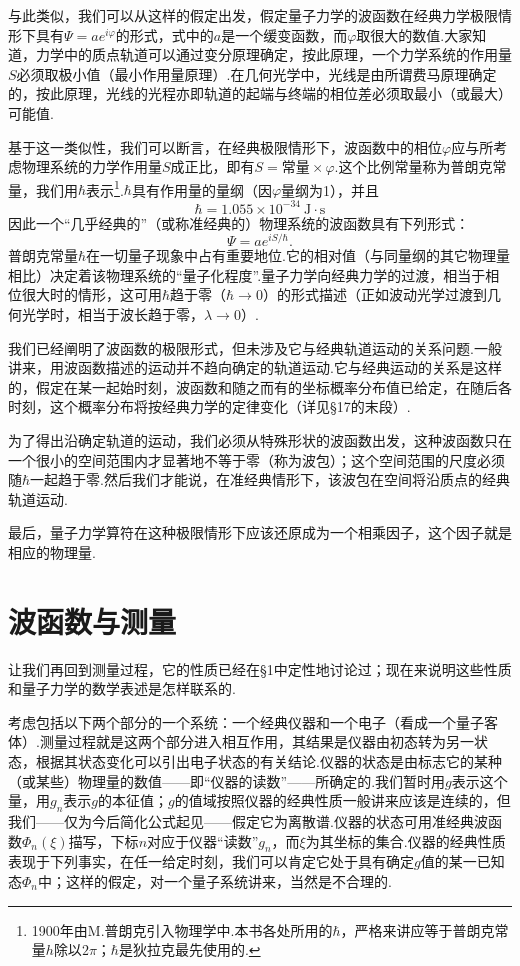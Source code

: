 与此类似，我们可以从这样的假定出发，假定量子力学的波函数在经典力学极限情形下具有$\varPsi=ae^{i\varphi}$的形式，式中的$a$是一个缓变函数，而$\varphi$取很大的数值.大家知道，力学中的质点轨道可以通过变分原理确定，按此原理，一个力学系统的作用量$S$必须取极小值（最小作用量原理）.在几何光学中，光线是由所谓费马原理确定的，按此原理，光线的光程亦即轨道的起端与终端的相位差必须取最小（或最大）可能值.

基于这一类似性，我们可以断言，在经典极限情形下，波函数中的相位$\varphi$应与所考虑物理系统的力学作用量$S$成正比，即有$S=\text{常量}\times\varphi$.这个比例常量称为普朗克常量，我们用$\hbar$表示\footnote{1900年由M.普朗克引入物理学中.本书各处所用的$\hbar$，严格来讲应等于普朗克常量$h$除以$2\pi$；$\hbar$是狄拉克最先使用的.}.$\hbar$具有作用量的量纲（因$\varphi$量纲为1），并且
\begin{equation*}
  \hbar=1.055\times10^{-34}\ \mathrm{J}\cdot\mathrm{s}
\end{equation*}
因此一个“几乎经典的”（或称准经典的）物理系统的波函数具有下列形式：
\begin{equation}
  \varPsi=ae^{iS/\hbar}.
\end{equation}
普朗克常量$\hbar$在一切量子现象中占有重要地位.它的相对值（与同量纲的其它物理量相比）决定着该物理系统的“量子化程度”.量子力学向经典力学的过渡，相当于相位很大时的情形，这可用$\hbar$趋于零（$\hbar\to0$）的形式描述（正如波动光学过渡到几何光学时，相当于波长趋于零，$\lambda\to0$）.

我们已经阐明了波函数的极限形式，但未涉及它与经典轨道运动的关系问题.一般讲来，用波函数描述的运动并不趋向确定的轨道运动.它与经典运动的关系是这样的，假定在某一起始时刻，波函数和随之而有的坐标概率分布值已给定，在随后各时刻，这个概率分布将按经典力学的定律变化（详见§17的末段）.

为了得出沿确定轨道的运动，我们必须从特殊形状的波函数出发，这种波函数只在一个很小的空间范围内才显著地不等于零（称为波包）；这个空间范围的尺度必须随$\hbar$一起趋于零.然后我们才能说，在准经典情形下，该波包在空间将沿质点的经典轨道运动.

最后，量子力学算符在这种极限情形下应该还原成为一个相乘因子，这个因子就是相应的物理量.

\section{波函数与测量}

让我们再回到测量过程，它的性质已经在§1中定性地讨论过；现在来说明这些性质和量子力学的数学表述是怎样联系的.

考虑包括以下两个部分的一个系统：一个经典仪器和一个电子（看成一个量子客体）.测量过程就是这两个部分进入相互作用，其结果是仪器由初态转为另一状态，根据其状态变化可以引出电子状态的有关结论.仪器的状态是由标志它的某种（或某些）物理量的数值——即“仪器的读数”——所确定的.我们暂时用$g$表示这个量，用$g_n$表示$g$的本征值；$g$的值域按照仪器的经典性质一般讲来应该是连续的，但我们——仅为今后简化公式起见——假定它为离散谱.仪器的状态可用准经典波函数$\varPhi_n(\xi)$描写，下标$n$对应于仪器“读数”$g_n$，而$\xi$为其坐标的集合.仪器的经典性质表现于下列事实，在任一给定时刻，我们可以肯定它处于具有确定$g$值的某一已知态$\varPhi_n$中；这样的假定，对一个量子系统讲来，当然是不合理的.

